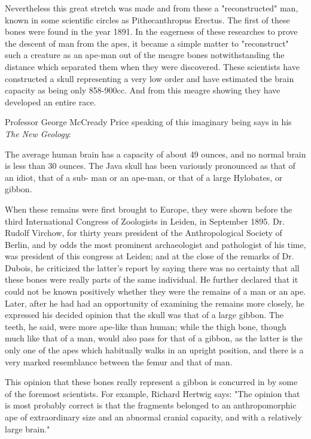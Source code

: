 Nevertheless this great stretch was made and from these a "reconstructed" man, known in
some scientific circles as Pithecanthropus Erectus. The first of these bones were found in the
year 1891. In the eagerness of these researches to prove the descent of man from the apes, it
became a simple matter to "reconstruct" such a creature as an ape-man out of the meagre
bones notwithstanding the distance which separated them when they were discovered. These
scientists have constructed a skull representing a very low order and have estimated the brain
capacity as being only 858-900cc. And from this meagre showing they have developed an
entire race.

Professor George McCready Price speaking of this imaginary being says in his \textit{The New
Geology}:

The average human brain has a capacity of about 49 ounces, and no normal brain is less than
30 ounces. The Java skull has been variously pronounced as that of an idiot, that of a sub-
man or an ape-man, or that of a large Hylobates, or gibbon.

When these remains were first brought to Europe, they were shown before the third
International Congress of Zoologists in Leiden, in September 1895. Dr. Rudolf Virchow, for
thirty years president of the Anthropological Society of Berlin, and by odds the most
prominent archaeologist and pathologist of his time, was president of this congress at Leiden;
and at the close of the remarks of Dr. Dubois, he criticized the latter's report by saying there
was no certainty that all these bones were really parts of the same individual. He further
declared that it could not be known positively whether they were the remains of a man or an
ape. Later, after he had had an opportunity of examining the remains more closely, he
expressed his decided opinion that the skull was that of a large gibbon. The teeth, he said,
were more ape-like than human; while the thigh bone, though much like that of a man, would
also pass for that of a gibbon, as the latter is the only one of the apes which habitually walks
in an upright position, and there is a very marked resemblance between the femur and that of
man.

This opinion that these bones really represent a gibbon is concurred in by some of the
foremost scientists. For example, Richard Hertwig says: "The opinion that is most probably
correct is that the fragments belonged to an anthropomorphic ape of extraordinary size and an
abnormal cranial capacity, and with a relatively large brain."

